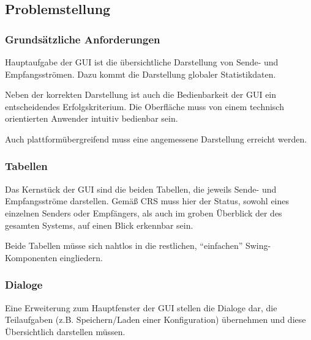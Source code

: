         \subsection{Problemstellung}
    
            
            \subsubsection{Grundsätzliche Anforderungen}
            
                Hauptaufgabe der GUI ist die übersichtliche Darstellung von
                Sende- und Empfangsströmen. Dazu kommt die Darstellung globaler
                Statistikdaten.
                
                Neben der korrekten Darstellung ist auch die Bedienbarkeit der
                GUI ein entscheidendes Erfolgskriterium. Die Oberfläche muss von
                einem technisch orientierten Anwender intuitiv bedienbar sein.
                
                Auch plattformübergreifend muss eine angemessene Darstellung
                erreicht werden.
                
            \subsubsection{Tabellen}
            
                Das Kernstück der GUI sind die beiden Tabellen, die jeweils
                Sende- und Empfangsströme darstellen. Gemäß CRS muss hier der
                Status, sowohl eines einzelnen Senders oder Empfängers, als auch
                im groben Überblick der des gesamten Systems, auf einen Blick
                erkennbar sein.
                
                Beide Tabellen müsse sich nahtlos in die restlichen,
                ``einfachen'' Swing-Komponenten eingliedern.
            
            \subsubsection{Dialoge}
           
           		Eine Erweiterung zum Hauptfenster der GUI stellen die Dialoge dar,
           		die Teilaufgaben (z.B. Speichern/Laden einer Konfiguration)
           		übernehmen und diese Übersichtlich darstellen müssen.

